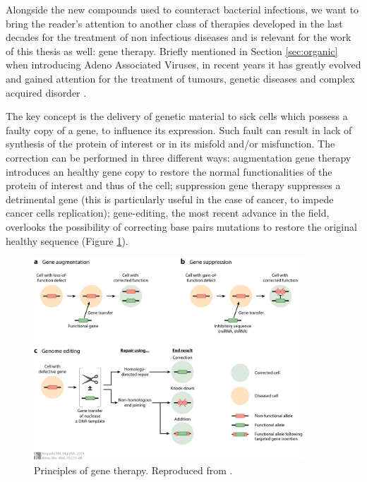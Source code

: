 
Alongside the new compounds used to counteract bacterial infections, we want to bring the reader's attention to another class of therapies developed in the last decades for the treatment of non infectious diseases and is relevant for the work of this thesis as well: gene therapy. Briefly mentioned in Section \ref{sec:organic} when introducing Adeno Associated Viruses, in recent years it has greatly evolved and gained attention for the treatment of tumours, genetic diseases and complex acquired disorder \cite{Anguela2019}.

The key concept is the delivery of genetic material to sick cells which possess a faulty copy of a gene, to influence its expression. Such fault can result in lack of synthesis of the protein of interest or in its misfold and/or misfunction. The correction can be performed in three different ways: augmentation gene therapy introduces an healthy gene copy to restore the normal functionalities of the protein of interest and thus of the cell; suppression gene therapy suppresses a detrimental gene (this is particularly useful in the case of cancer, to impede cancer cells replication); gene-editing, the most recent advance in the field, overlooks the possibility of correcting base pairs mutations to restore the original healthy sequence (Figure \ref{fig:gene_therapy}).

\begin{figure}
\begin{center}
\includegraphics[width = 0.9\textwidth]{1introduction/pics/gene_therapy.jpeg}
\caption[Principles of gene therapy]{Principles of gene therapy. Reproduced from \cite{Anguela2019}.} \label{fig:gene_therapy}
\end{center}
\end{figure}

